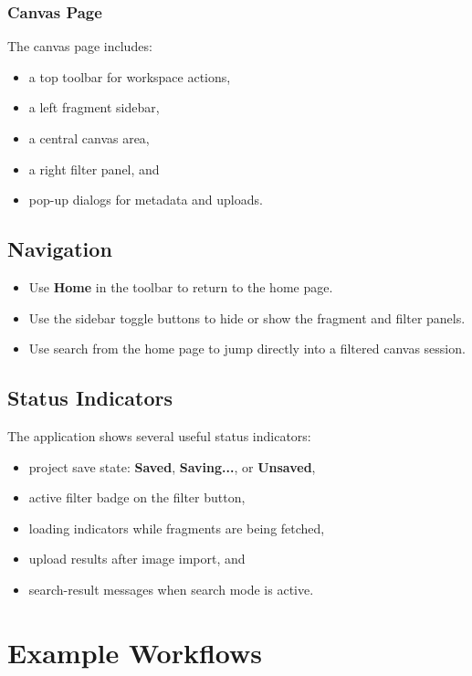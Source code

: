 \documentclass[12pt]{article}
\begin{document}
\subsubsection{Canvas Page}
The canvas page includes:
\begin{itemize}
  \item a top toolbar for workspace actions,
  \item a left fragment sidebar,
  \item a central canvas area,
  \item a right filter panel, and
  \item pop-up dialogs for metadata and uploads.
\end{itemize}

\subsection{Navigation}
\begin{itemize}
  \item Use \textbf{Home} in the toolbar to return to the home page.
  \item Use the sidebar toggle buttons to hide or show the fragment and filter panels.
  \item Use search from the home page to jump directly into a filtered canvas session.
\end{itemize}

\subsection{Status Indicators}
The application shows several useful status indicators:
\begin{itemize}
  \item project save state: \textbf{Saved}, \textbf{Saving...}, or \textbf{Unsaved},
  \item active filter badge on the filter button,
  \item loading indicators while fragments are being fetched,
  \item upload results after image import, and
  \item search-result messages when search mode is active.
\end{itemize}

\section{Example Workflows}
\end{document}
